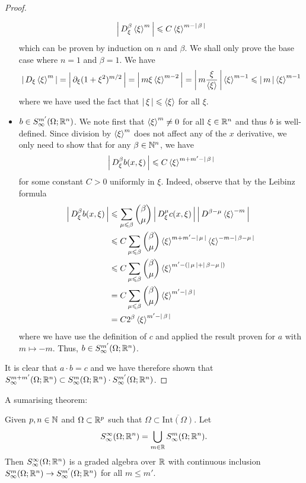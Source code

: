 \documentclass{article}
\begin{document}
\begin{proof}
\begin{itemize}
        \[
        \abs{D^\beta_\xi \sym[\xi]^m} \leq C \sym[\xi]^{m - \abs{\beta}}
        \]
        which can be proven by induction on $n$ and $\beta$. We shall only prove the base case where $n = 1$ and $\beta = 1$. We have 
        \begin{align*}
        \abs{D_\xi \sym[\xi]^m} = \abs{\p_\xi (1 + \xi^2)^{m/2}} = \abs{m\xi \sym[\xi]^{m - 2}} = \abs{m \frac{\xi}{\sym[\xi]}} \sym[\xi]^{m - 1} \leq \abs{m} \sym[\xi]^{m - 1}
        \end{align*}
        where we have used the fact that $\abs{\xi} \leq \sym[\xi]$ for all $\xi$. 
        \item $b \in S^{m'}_\infty(\Omega; \R^n)$. We note first that $\sym[\xi]^m \neq 0$ for all $\xi \in \R^n$ and thus $b$ is well-defined. Since division by $\sym[\xi]^m$ does not affect any of the $x$ derivative, we only need to show that for any $\beta \in \N^n$, we have
        \[
        \abs{D^\beta_\xi b(x, \xi)} \leq C \sym[\xi]^{m + m' - \abs{\beta}}
        \]
        for some constant $C > 0$ uniformly in $\xi$. Indeed, observe that by the Leibinz formula
        \begin{align*}
        \abs{D^\beta_\xi b(x, \xi)} 
        & \leq \sum_{\mu \leq \beta} \binom{\beta}{\mu} \abs{D^\mu_\xi c(x, \xi)} \abs{D^{\beta - \mu} \sym[\xi]^{-m}} \\
        & \leq C \sum_{\mu \leq \beta} \binom{\beta}{\mu} \sym[\xi]^{m + m' - \abs{\mu}} \sym[\xi]^{-m - \abs{\beta - \mu}} \\
        & \leq C \sum_{\mu \leq \beta} \binom{\beta}{\mu} \sym[\xi]^{ m' - (\abs{\mu} +  \abs{\beta - \mu})} \\
        & = C \sum_{\mu \leq \beta} \binom{\beta}{\mu} \sym[\xi]^{ m' -\abs{\beta}} \\
        &= C 2^{\beta} \sym[\xi]^{ m' -\abs{\beta}} 
        \end{align*}
        where we have use the definition of $c$ and applied the result proven for $a$ with $m \mapsto -m$. Thus, $b \in S^{m'}_\infty(\Omega; \R^n)$. 
    \end{itemize}
It is clear that $a \cdot b = c$ and we have therefore shown that $S^{m + m'}_\infty(\Omega; \R^n) \subset S^{m}_\infty(\Omega; \R^n) \cdot S^{m'}_\infty(\Omega; \R^n)$. 


    
\end{proof}

A sumarising theorem: 
\begin{ftheorem}
    Given $p, n \in \N$ and $\Omega \subset \R^p$ such that $\Omega \subset \overline{\mathrm{Int}(\Omega)}$. Let 
    \[
    S^\infty_\infty(\Omega; \R^n) = \bigcup_{m \in \R} S^m_\infty(\Omega; \R^n). 
    \]
    Then $S^\infty_\infty(\Omega; \R^n)$ is a graded algebra over $\R$ with continuous  inclusion  $S^{m}_\infty(\Omega; \R^n) \to S^{m'}_\infty(\Omega; \R^n)$ for all $m \leq m'$. 
\end{ftheorem}
\end{document}
